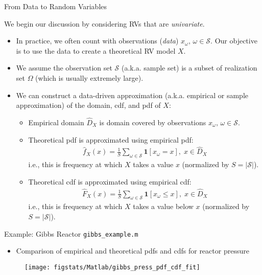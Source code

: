 \documentclass[9pt]{beamer}
\begin{document}
\begin{frame}{From Data to Random Variables}
\begin{block}{}
We begin our discussion by considering RVs that are {\em univariate}.
\end{block}
\begin{itemize}
 \setlength{\itemsep}{5pt}
\item In practice, we often count with observations ({\em data}) $x_\omega,\, \omega \in \mathcal{S}$. Our objective is to use the data to create a theoretical RV model $X$. 
\item We assume the observation set $\mathcal{S}$ (a.k.a. sample set) is a subset of realization set $\Omega$ (which is usually extremely large). 

\item We can construct a data-driven approximation (a.k.a. empirical or sample approximation) of the domain, cdf, and pdf of $X$:

\begin{itemize}
 \setlength{\itemsep}{10pt}
\item Empirical domain $\hat{D}_X$ is domain covered by observations $x_\omega,\, \omega \in \mathcal{S}$.
\item Theoretical pdf is approximated using empirical pdf: 
\begin{align*}
\hat{f}_X(x)=\frac{1}{S}\sum_{\omega \in \mathcal{S}}\mathbf{1}[x_\omega= x],\; x\in \hat{D}_X
\end{align*}
i.e., this is frequency at which $X$ takes a value $x$ (normalized by $S=|\mathcal{S}|$). 
\item Theoretical cdf is approximated using empirical cdf:
\begin{align*}
\hat{F}_X(x)=\frac{1}{S}\sum_{\omega \in \mathcal{S}}\mathbf{1}[x_\omega\leq x],\; x\in \hat{D}_X
\end{align*}
i.e., this is frequency at which $X$ takes a value below $x$ (normalized by $S=|\mathcal{S}|$). 
\end{itemize}
\end{itemize}
\end{frame}

\begin{frame}{Example: Gibbs Reactor \footnotesize{\texttt{gibbs\_example.m}}}

\begin{itemize}
\item Comparison of empirical and theoretical pdfs and cdfs for reactor pressure
\end{itemize}
\begin{figure}[!htb]
    \centering
	\texttt{[image: figstats/Matlab/gibbs\_press\_pdf\_cdf\_fit]}
\end{figure}

\end{frame}
\end{document}
